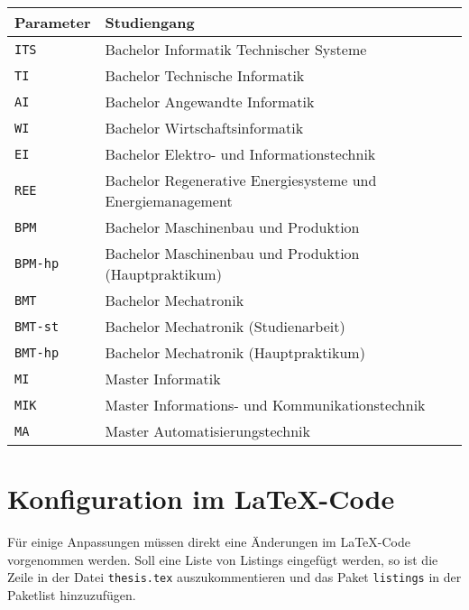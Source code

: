 \begin{center}
  \begin {tabular}{ll}
    Parameter & Studiengang \\
    \hline
    \texttt{ITS} & Bachelor Informatik Technischer Systeme \\
    \texttt{TI} & Bachelor Technische Informatik \\
    \texttt{AI} & Bachelor Angewandte Informatik \\
    \texttt{WI} & Bachelor Wirtschaftsinformatik \\
    \texttt{EI} & Bachelor Elektro- und Informationstechnik \\
    \texttt{REE} & Bachelor Regenerative Energiesysteme und Energiemanagement \\
    \texttt{BPM} & Bachelor Maschinenbau und Produktion \\
    \texttt{BPM-hp} & Bachelor Maschinenbau und Produktion (Hauptpraktikum)\\
    \texttt{BMT} & Bachelor Mechatronik \\
    \texttt{BMT-st} & Bachelor Mechatronik (Studienarbeit)\\
    \texttt{BMT-hp} & Bachelor Mechatronik (Hauptpraktikum)\\
    \texttt{MI} & Master Informatik \\
    \texttt{MIK} & Master Informations- und Kommunikationstechnik \\
    \texttt{MA} & Master Automatisierungstechnik \\
  \end{tabular}
\end{center}

\section{Konfiguration im \LaTeX -Code}\label{sec:codechanges}
Für einige Anpassungen müssen direkt eine Änderungen im \LaTeX -Code vorgenommen werden. Soll eine Liste von Listings eingefügt werden, so ist die Zeile in der Datei \texttt{thesis.tex} auszukommentieren und das Paket \texttt{listings} in der Paketlist hinzuzufügen.
